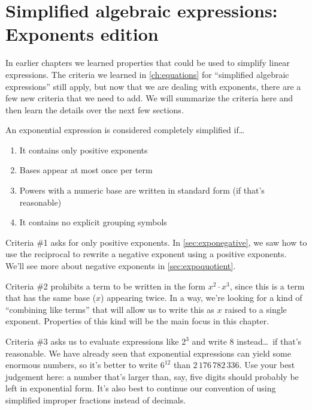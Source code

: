 \section{Simplified algebraic expressions: Exponents edition}

In earlier chapters we learned properties that could be used to simplify linear expressions. The criteria we learned in \cref{ch:equations} for ``simplified algebraic expressions'' still apply, but now that we are dealing with exponents, there are a few new criteria that we need to add. We will summarize the criteria here and then learn the details over the next few sections.

\begin{boxcrit}
An exponential expression is considered completely simplified if\ldots
\begin{enumerate}
	\item It contains only positive exponents
	\item Bases appear at most once per term
	\item Powers with a numeric base are written in standard form (if that's reasonable)
	\item It contains no explicit grouping symbols
\end{enumerate}
\end{boxcrit}

Criteria \#1 asks for only positive exponents. In \cref{sec:exponegative}, we saw how to use the reciprocal to rewrite a negative exponent using a positive exponents. We'll see more about negative exponents in \cref{sec:expoquotient}.

Criteria \#2 prohibits a term to be written in the form $x^2 \cdot x^3$, since this is a term that has the same base ($x$) appearing twice. In a way, we're looking for a kind of ``combining like terms'' that will allow us to write this as $x$ raised to a single exponent. Properties of this kind will be the main focus in this chapter.

Criteria \#3 asks us to evaluate expressions like $2^3$ and write 8 instead\ldots\ if that's reasonable. We have already seen that exponential expressions can yield some enormous numbers, so it's better to write $6^{12}$ than $2\,176\,782\,336$. Use your best judgement here: a number that's larger than, say, five digits should probably be left in exponential form. It's also best to continue our convention of using simplified improper fractions instead of decimals.

